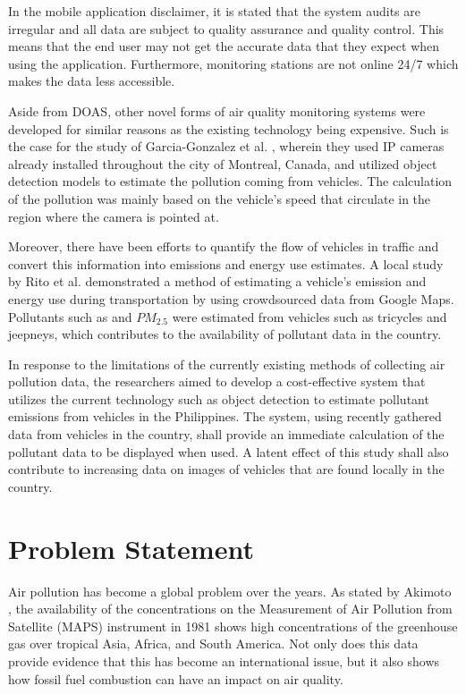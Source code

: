 In the mobile application disclaimer, it is stated that the system audits are irregular and all data are subject to quality assurance and quality control. This means that the end user may not get the accurate data that they expect when using the application. Furthermore, monitoring stations are not online 24/7 which makes the data less accessible.

Aside from DOAS, other novel forms of air quality monitoring systems were developed for similar reasons as the existing technology being expensive. Such is the case for the study of Garcia-Gonzalez et al. \citeyear{GARCIAGONZALEZ2021107950}, wherein they used IP cameras already installed throughout the city of Montreal, Canada, and utilized object detection models to estimate the pollution coming from vehicles. The calculation of the pollution was mainly based on the vehicle’s speed that circulate in the region where the camera is pointed at.

Moreover, there have been efforts to quantify the flow of vehicles in traffic and convert this information into emissions and energy use estimates. A local study by Rito et al.\citeyear{rito_lopez_biona_2021} demonstrated a method of estimating a vehicle’s emission and energy use during transportation by using crowdsourced data from Google Maps. Pollutants such as  and $PM_{2.5}$ were estimated from vehicles such as tricycles and jeepneys, which contributes to the availability of pollutant data in the country.

In response to the limitations of the currently existing methods of collecting air pollution data, the researchers aimed to develop a cost-effective system that utilizes the current technology such as object detection to estimate pollutant emissions from vehicles in the Philippines. The system, using recently gathered data from vehicles in the country, shall provide an immediate calculation of the pollutant data to be displayed when used. A latent effect of this study shall also contribute to increasing data on images of vehicles that are found locally in the country.



\section{Problem Statement}
	Air pollution has become a global problem over the years. As stated by Akimoto \citeyear{Akimoto2004}, the availability of the  concentrations on the Measurement of Air Pollution from Satellite (MAPS) instrument in 1981 shows high concentrations of the greenhouse gas over tropical Asia, Africa, and South America. Not only does this data provide evidence that this has become an international issue,  but it also shows how fossil fuel combustion can have an impact on air quality. 


